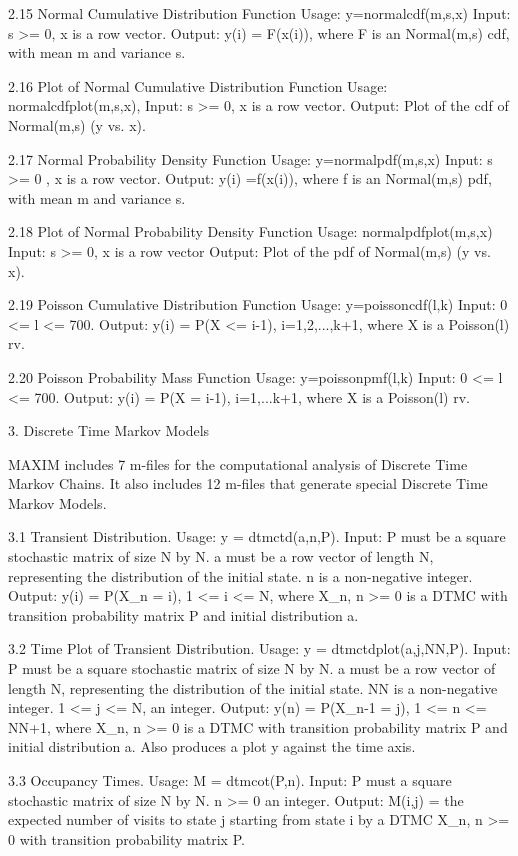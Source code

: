 2.15  Normal Cumulative Distribution Function
Usage:  y=normalcdf(m,s,x)
Input: s >= 0, x is a row vector.
Output: y(i) =  F(x(i)), where F is an Normal(m,s) cdf, with mean  m and variance s. 

2.16 Plot of Normal Cumulative Distribution Function
Usage:  normalcdfplot(m,s,x),
Input: s >= 0, x is a row vector.
Output: Plot of the cdf of Normal(m,s) (y vs. x). 

2.17 Normal Probability Density Function
Usage:  y=normalpdf(m,s,x)
Input:  s >= 0 , x is a row vector.
Output: y(i) =f(x(i)), where f is an Normal(m,s) pdf, with mean m and variance s. 

2.18 Plot of Normal Probability Density Function
Usage:  normalpdfplot(m,s,x)
Input: s >= 0, x is a row vector
Output: Plot of the pdf of Normal(m,s) (y vs. x). 

2.19 Poisson Cumulative Distribution Function
Usage:  y=poissoncdf(l,k)
Input: 0 <= l <= 700.
Output: y(i) = P(X <= i-1),  i=1,2,...,k+1, where X is a  Poisson(l) rv.
 
2.20 Poisson Probability Mass Function
Usage:  y=poissonpmf(l,k)
Input:  0 <= l <= 700.
Output: y(i) = P(X = i-1),  i=1,...k+1, where X  is a Poisson(l) rv.
 


3. Discrete Time Markov Models


MAXIM includes 7 m-files for the computational analysis of Discrete Time Markov Chains. It also includes 12 m-files that generate special Discrete Time Markov Models.

3.1 Transient Distribution.
Usage:  y = dtmctd(a,n,P).
Input: P must be  a square stochastic matrix of size N by N. a must be  a row vector of length N, representing the distribution of the initial state. n is a non-negative integer.  
Output: y(i) = P(X_n = i),  1 <= i <= N, where X_n, n >= 0 is a DTMC with transition probability matrix P and initial distribution a.

3.2 Time Plot of Transient Distribution.
Usage:  y = dtmctdplot(a,j,NN,P).
Input: P must be a square stochastic matrix of size N by N. a must be  a row vector of length N, representing the distribution of the initial state. NN is a non-negative integer. 1 <= j <= N, an integer. 
Output: y(n) = P(X_n-1 = j),  1 <= n <= NN+1, where X_n, n >= 0 is a DTMC with transition probability matrix P and initial distribution a. Also produces a plot y against the time axis.

3.3  Occupancy Times.
Usage:  M = dtmcot(P,n).
Input: P must a square stochastic matrix of size N by N. n >= 0 an integer. 
Output: M(i,j) = the expected number of visits to state j starting from state i by a DTMC X_n, n >= 0 with transition probability matrix P.

